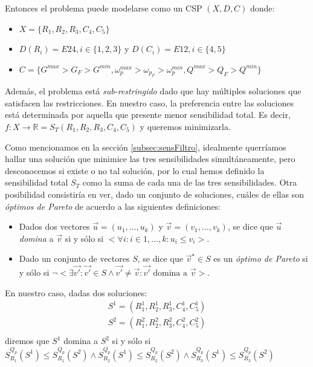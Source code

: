 \documentclass{llncs}
\begin{document}
		Entonces el problema puede modelarse como un CSP $(X, D, C)$ donde:
		
		\begin{itemize}
			\item $X = \{R_1, R_2, R_3, C_4, C_5\}$
			\item $D(R_i) = E24, i \in \{1,2,3\}$ y $D(C_i) = E12, i \in \{4,5\}$
			\item $C = \{G^{max} > G_F > G^{min}, \omega_p^{max} > \omega_{p_F} > \omega_p^{min},
			Q^{max} > Q_F > Q^{min}\}$
		\end{itemize}
	
		Además, el problema está \textit{sub-restringido} dado que hay múltiples soluciones que satisfacen las restricciones.
		En nuestro caso, la preferencia entre las soluciones está determinada por aquella que presente menor sensibilidad total. 
		Es decir, $f: X \rightarrow \mathbb{R} = S_T(R_1, R_2, R_3, C_4, C_5)$ y queremos minimizarla.
		
		Como mencionamos en la sección \ref{subsec:sensFiltro}, idealmente querríamos hallar una solución que minimice las tres
		sensibilidades simultáneamente, pero desconocemos si existe o no tal solución, por lo cual hemos definido la sensibilidad total
		$S_T$ como la suma de cada una de las tres sensibilidades. Otra posibilidad consistiría en ver, dado un conjunto
		de soluciones, cuáles de ellas son \textit{óptimos de Pareto} de acuerdo a las siguientes definiciones:
		\begin{itemize}
			\item Dados dos vectores $\vec{u} = (u_1, \dots, u_k)$ y $\vec{v} = (v_1, \dots, v_k)$, se dice que $\vec{u}$ \textit{domina}
			a $\vec{v}$ si y sólo si $\bigl<\forall i : i \in {1, \dots, k} : u_i \leq v_i\bigr>$.
			\item Dado un conjunto de vectores $S$, se dice que $\vec{v}^{\star} \in S$ es un \textit{óptimo de Pareto} si y sólo si
			$\neg \bigl<\exists \vec{v'} : \vec{v'} \in S \wedge \vec{v'} \neq \vec{v} : \vec{v'} \text{ domina a } \vec{v}\bigr>$.
		\end{itemize}
	
	  En nuestro caso, dadas dos soluciones:
	  \begin{align*}
	  		S^1 = (R_1^1, R_2^1, R_3^1, C_4^1, C_5^1)\\
	  		S^2 = (R_1^2, R_2^2, R_3^2, C_4^2, C_5^2)\\
	  \end{align*}
	  diremos que $S^1$ domina a $S^2$ si y sólo si $S_{R_1}^{Q_p}(S^1) \leq S_{R_1}^{Q_p}(S^2) \wedge S_{R_2}^{Q_p}(S^1) \leq S_{R_2}^{Q_p}(S^2) \wedge S_{R_3}^{Q_p}(S^1) \leq S_{R_3}^{Q_p}(S^2)$
	  
\end{document}
